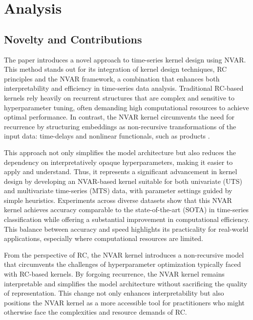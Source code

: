 \chapter{Analysis} \label{chap:analysis}

\section{Novelty and Contributions}

The paper introduces a novel approach to time-series kernel design using NVAR. This method stands out for its integration of kernel design techniques, RC principles and the NVAR framework, a combination that enhances both interpretability and efficiency in time-series data analysis. Traditional RC-based kernels rely heavily on recurrent structures that are complex and sensitive to hyperparameter tuning, often demanding high computational resources to achieve optimal performance. In contrast, the NVAR kernel circumvents the need for recurrence by structuring embeddings as non-recursive transformations of the input data: time-delays and nonlinear functionals, such as products \cite{gauthier2021}.

This approach not only simplifies the model architecture but also reduces the dependency on interpretatively opaque hyperparameters, making it easier to apply and understand. Thus, it represents a significant advancement in kernel design by developing an NVAR-based kernel suitable for both univariate (UTS) and multivariate time-series (MTS) data, with parameter settings guided by simple heuristics. Experiments across diverse datasets show that this NVAR kernel achieves accuracy comparable to the state-of-the-art (SOTA) in time-series classification while offering a substantial improvement in computational efficiency. This balance between accuracy and speed highlights its practicality for real-world applications, especially where computational resources are limited.

From the perspective of RC, the NVAR kernel introduces a non-recursive model that circumvents the challenges of hyperparameter optimization typically faced with RC-based kernels. By forgoing recurrence, the NVAR kernel remains interpretable and simplifies the model architecture without sacrificing the quality of representation. This change not only enhances interpretability but also positions the NVAR kernel as a more accessible tool for practitioners who might otherwise face the complexities and resource demands of RC.

